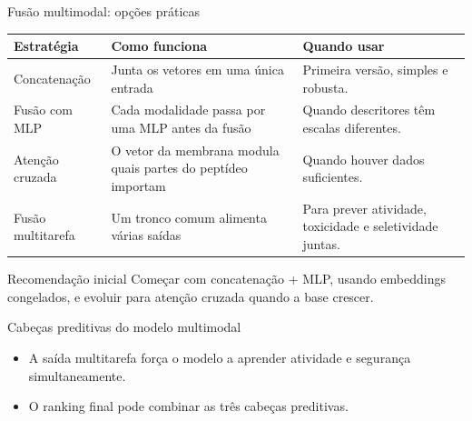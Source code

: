 \documentclass[aspectratio=169,10pt]{beamer}
\begin{document}
\begin{frame}{Fusão multimodal: opções práticas}
\small
\begin{center}
\begin{tabular}{p{3.2cm}p{4.1cm}p{4.8cm}}
\toprule
\textbf{Estratégia} & \textbf{Como funciona} & \textbf{Quando usar} \\
\midrule
Concatenação & Junta os vetores em uma única entrada & Primeira versão, simples e robusta. \\
Fusão com MLP & Cada modalidade passa por uma MLP antes da fusão & Quando descritores têm escalas diferentes. \\
Atenção cruzada & O vetor da membrana modula quais partes do peptídeo importam & Quando houver dados suficientes. \\
Fusão multitarefa & Um tronco comum alimenta várias saídas & Para prever atividade, toxicidade e seletividade juntas. \\
\bottomrule
\end{tabular}
\end{center}

\vspace{0.15cm}
\begin{block}{Recomendação inicial}
Começar com concatenação + MLP, usando embeddings congelados, e evoluir para atenção cruzada quando a base crescer.
\end{block}
\end{frame}

\begin{frame}{Cabeças preditivas do modelo multimodal}
\begin{center}
\end{center}

\vspace{0.1cm}
\begin{itemize}
  \item A saída multitarefa força o modelo a aprender atividade e segurança simultaneamente.
  \item O ranking final pode combinar as três cabeças preditivas.
\end{itemize}
\end{frame}
\end{document}
